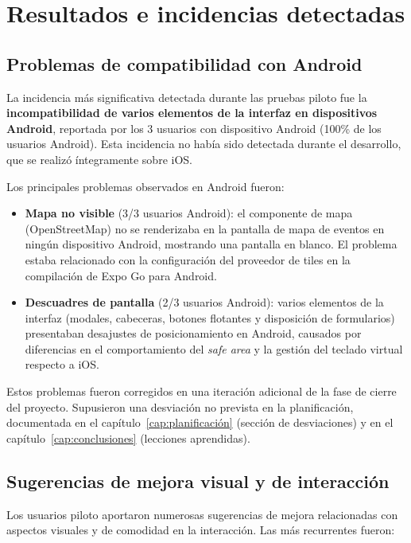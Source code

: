 \section{Resultados e incidencias detectadas}

\subsection{Problemas de compatibilidad con Android}

La incidencia más significativa detectada durante las pruebas piloto fue la \textbf{incompatibilidad de varios elementos de la interfaz en dispositivos Android}, reportada por los 3 usuarios con dispositivo Android (100\% de los usuarios Android). Esta incidencia no había sido detectada durante el desarrollo, que se realizó íntegramente sobre iOS.

Los principales problemas observados en Android fueron:

\begin{itemize}
    \item \textbf{Mapa no visible} (3/3 usuarios Android): el componente de mapa (OpenStreetMap) no se renderizaba en la pantalla de mapa de eventos en ningún dispositivo Android, mostrando una pantalla en blanco. El problema estaba relacionado con la configuración del proveedor de tiles en la compilación de Expo Go para Android.

    \item \textbf{Descuadres de pantalla} (2/3 usuarios Android): varios elementos de la interfaz (modales, cabeceras, botones flotantes y disposición de formularios) presentaban desajustes de posicionamiento en Android, causados por diferencias en el comportamiento del \textit{safe area} y la gestión del teclado virtual respecto a iOS.
\end{itemize}

Estos problemas fueron corregidos en una iteración adicional de la fase de cierre del proyecto. Supusieron una desviación no prevista en la planificación, documentada en el capítulo~\ref{cap:planificación} (sección de desviaciones) y en el capítulo~\ref{cap:conclusiones} (lecciones aprendidas).

\subsection{Sugerencias de mejora visual y de interacción}

Los usuarios piloto aportaron numerosas sugerencias de mejora relacionadas con aspectos visuales y de comodidad en la interacción. Las más recurrentes fueron:

